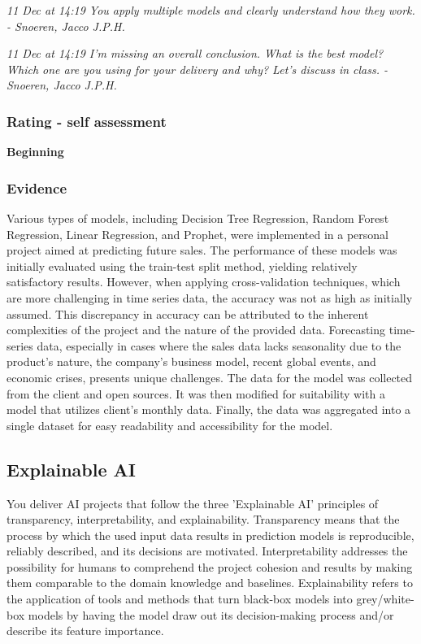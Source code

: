 \documentclass[a4paper, 11pt]{article}
\begin{document}
\begin{mdframed}[backgroundcolor=gray!20, linecolor=black, linewidth=0pt, leftmargin=1cm, rightmargin=1cm, innertopmargin=10pt, innerbottommargin=10pt]
  \itshape
  11 Dec at 14:19 \smallbreak
  You apply multiple models and clearly understand how they work.\smallbreak
- Snoeren, Jacco J.P.H.
\end{mdframed}

\begin{mdframed}[backgroundcolor=gray!20, linecolor=black, linewidth=0pt, leftmargin=1cm, rightmargin=1cm, innertopmargin=10pt, innerbottommargin=10pt]
  \itshape
  11 Dec at 14:19 \smallbreak
  I'm missing an overall conclusion. What is the best model? Which one are you using for your delivery and why? Let's discuss in class. \smallbreak
- Snoeren, Jacco J.P.H.
\end{mdframed}


\subsubsection{Rating - self assessment}
\textbf{Beginning} 
\subsubsection{Evidence}
Various types of models, including Decision Tree Regression, Random Forest Regression, Linear Regression, and Prophet, were implemented in a personal project aimed at predicting future sales. The performance of these models was initially evaluated using the train-test split method, yielding relatively satisfactory results. However, when applying cross-validation techniques, which are more challenging in time series data, the accuracy was not as high as initially assumed. This discrepancy in accuracy can be attributed to the inherent complexities of the project and the nature of the provided data. Forecasting time-series data, especially in cases where the sales data lacks seasonality due to the product's nature, the company's business model, recent global events, and economic crises, presents unique challenges. The data for the model was collected from the client and open sources. It was then modified for suitability with a model that utilizes client's monthly data. Finally, the data was aggregated into a single dataset for easy readability and accessibility for the model.



\subsection{Explainable AI}
You deliver AI projects that follow the three 'Explainable AI' principles of transparency, interpretability, and explainability. 
\medbreak
Transparency means that the process by which the used input data results in prediction models is reproducible, reliably described, and its decisions are motivated. Interpretability addresses the possibility for humans to comprehend the project cohesion and results by making them comparable to the domain knowledge and baselines. Explainability refers to the application of tools and methods that turn black-box models into grey/white-box models by having the model draw out its decision-making process and/or describe its feature importance. 
\end{document}
